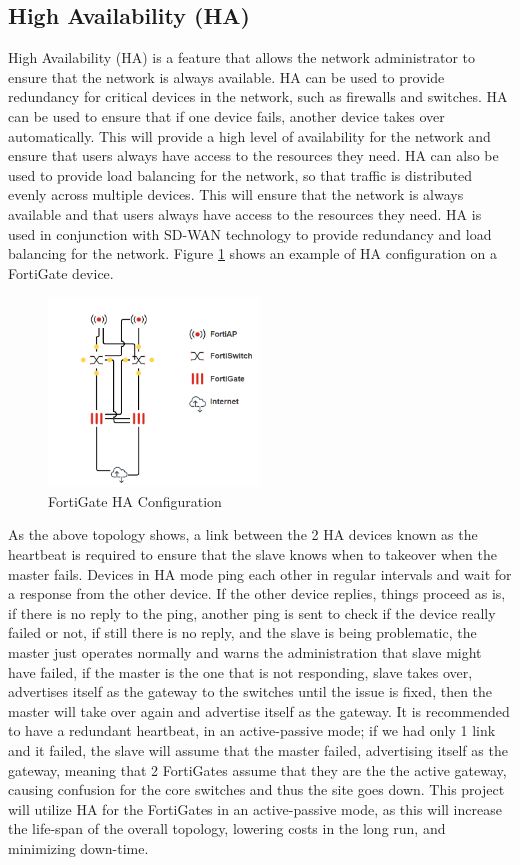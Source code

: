 \documentclass[12pt]{report}
\begin{document}
\subsection{High Availability (HA)}
High Availability (HA) is a feature that allows the network administrator to ensure that the network is always available. HA can be used to provide redundancy for critical devices in the network, such as firewalls and switches. HA can be used to ensure that if one device fails, another device takes over automatically. This will provide a high level of availability for the network and ensure that users always have access to the resources they need. HA can also be used to provide load balancing for the network, so that traffic is distributed evenly across multiple devices. This will ensure that the network is always available and that users always have access to the resources they need. HA is used in conjunction with SD-WAN technology to provide redundancy and load balancing for the network. Figure \ref{fig:HA} shows an example of HA configuration on a FortiGate device.
\begin{figure}[h]
    \centering
    \includegraphics[width=0.5\textwidth]{images/HA.png}
    \caption{FortiGate HA Configuration}
    \label{fig:HA}
\end{figure}
\newpage
As the above topology shows, a link between the 2 HA devices known as the heartbeat is required to ensure that the slave knows when to takeover when the master fails. Devices in HA mode ping each other in regular intervals and wait for a response from the other device. If the other device replies, things proceed as is, if there is no reply to the ping, another ping is sent to check if the device really failed or not, if still there is no reply, and the slave is being problematic, the master just operates normally and warns the administration that slave might have failed, if the master is the one that is not responding, slave takes over, advertises itself as the gateway to the switches until the issue is fixed, then the master will take over again and advertise itself as the gateway. It is recommended to have a redundant heartbeat, in an active-passive mode; if we had only 1 link and it failed, the slave will assume that the master failed, advertising itself as the gateway, meaning that 2 FortiGates assume that they are the the active gateway, causing confusion for the core switches and thus the site goes down. This project will utilize HA for the FortiGates in an active-passive mode, as this will increase the life-span of the overall topology, lowering costs in the long run, and minimizing down-time. \cite{HA} \cite{HA2}
\end{document}
